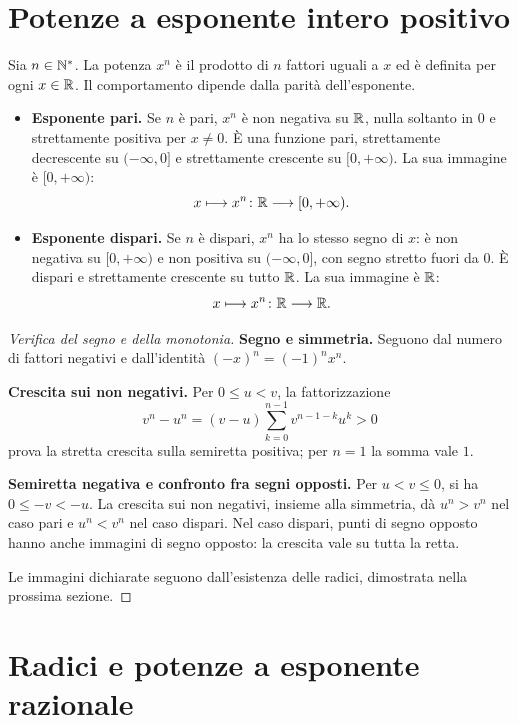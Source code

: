 \section{Potenze a esponente intero positivo}

Sia $n\in\mathbb{N}^*$. La potenza $x^n$ è il prodotto di $n$ fattori uguali a $x$ ed è definita per ogni $x\in\mathbb{R}$. Il comportamento dipende dalla parità dell'esponente.
\begin{itemize}
  \item \textbf{Esponente pari.} Se $n$ è pari, $x^n$ è non negativa su $\mathbb{R}$, nulla soltanto in $0$ e strettamente positiva per $x\ne0$. È una funzione pari, strettamente decrescente su $(-\infty,0]$ e strettamente crescente su $[0,+\infty)$. La sua immagine è $[0,+\infty)$:
  \[
  x\longmapsto x^n\colon\mathbb{R}\longrightarrow[0,+\infty).
  \]
  \item \textbf{Esponente dispari.} Se $n$ è dispari, $x^n$ ha lo stesso segno di $x$: è non negativa su $[0,+\infty)$ e non positiva su $(-\infty,0]$, con segno stretto fuori da $0$. È dispari e strettamente crescente su tutto $\mathbb{R}$. La sua immagine è $\mathbb{R}$:
  \[
  x\longmapsto x^n\colon\mathbb{R}\longrightarrow\mathbb{R}.
  \]
\end{itemize}

\begin{proof}[Verifica del segno e della monotonia]
\textbf{Segno e simmetria.} Seguono dal numero di fattori negativi e dall'identità $(-x)^n=(-1)^n x^n$.

\textbf{Crescita sui non negativi.} Per $0\le u<v$, la fattorizzazione
\[
v^n-u^n=(v-u)\sum_{k=0}^{n-1}v^{n-1-k}u^k>0
\]
prova la stretta crescita sulla semiretta positiva; per $n=1$ la somma vale $1$.

\textbf{Semiretta negativa e confronto fra segni opposti.} Per $u<v\le0$, si ha $0\le-v<-u$. La crescita sui non negativi, insieme alla simmetria, dà $u^n>v^n$ nel caso pari e $u^n<v^n$ nel caso dispari. Nel caso dispari, punti di segno opposto hanno anche immagini di segno opposto: la crescita vale su tutta la retta.

Le immagini dichiarate seguono dall'esistenza delle radici, dimostrata nella prossima sezione.
\end{proof}

\section{Radici e potenze a esponente razionale}

